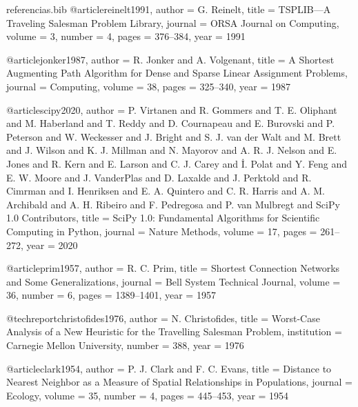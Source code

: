 \begin{filecontents*}{referencias.bib}
@article{reinelt1991,
  author  = {G. Reinelt},
  title   = {{TSPLIB}---A Traveling Salesman Problem Library},
  journal = {ORSA Journal on Computing},
  volume  = {3},
  number  = {4},
  pages   = {376--384},
  year    = {1991}
}

@article{jonker1987,
  author  = {R. Jonker and A. Volgenant},
  title   = {A Shortest Augmenting Path Algorithm for Dense and Sparse Linear Assignment Problems},
  journal = {Computing},
  volume  = {38},
  pages   = {325--340},
  year    = {1987}
}

@article{scipy2020,
  author  = {P. Virtanen and R. Gommers and T. E. Oliphant and M. Haberland and T. Reddy and D. Cournapeau and E. Burovski and P. Peterson and W. Weckesser and J. Bright and S. J. van der Walt and M. Brett and J. Wilson and K. J. Millman and N. Mayorov and A. R. J. Nelson and E. Jones and R. Kern and E. Larson and C. J. Carey and {\.I}. Polat and Y. Feng and E. W. Moore and J. VanderPlas and D. Laxalde and J. Perktold and R. Cimrman and I. Henriksen and E. A. Quintero and C. R. Harris and A. M. Archibald and A. H. Ribeiro and F. Pedregosa and P. van Mulbregt and {SciPy 1.0 Contributors}},
  title   = {{SciPy 1.0}: Fundamental Algorithms for Scientific Computing in {Python}},
  journal = {Nature Methods},
  volume  = {17},
  pages   = {261--272},
  year    = {2020}
}

@article{prim1957,
  author  = {R. C. Prim},
  title   = {Shortest Connection Networks and Some Generalizations},
  journal = {Bell System Technical Journal},
  volume  = {36},
  number  = {6},
  pages   = {1389--1401},
  year    = {1957}
}

@techreport{christofides1976,
  author      = {N. Christofides},
  title       = {Worst-Case Analysis of a New Heuristic for the Travelling Salesman Problem},
  institution = {Carnegie Mellon University},
  number      = {388},
  year        = {1976}
}

@article{clark1954,
  author  = {P. J. Clark and F. C. Evans},
  title   = {Distance to Nearest Neighbor as a Measure of Spatial Relationships in Populations},
  journal = {Ecology},
  volume  = {35},
  number  = {4},
  pages   = {445--453},
  year    = {1954}
}
\end{filecontents*}

\documentclass[12pt]{article}

\usepackage{sbc-template}
\usepackage{graphicx,url}
\usepackage[utf8]{inputenc}
\usepackage[brazil]{babel}
\usepackage{amsmath,amssymb,amsfonts}
\usepackage{booktabs}

